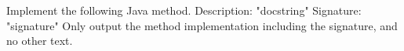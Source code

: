 Implement the following Java method.
Description: "{docstring}"
Signature: "{signature}"
Only output the method implementation including the signature, and no other text.